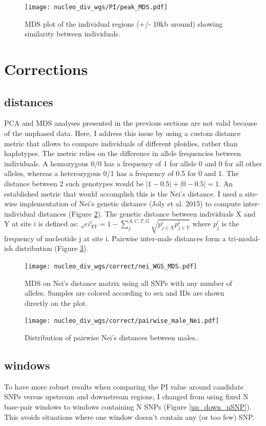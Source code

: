 \documentclass[10pt,a4paper]{report}
\begin{document}
\begin{figure}
\texttt{[image: nucleo\_div\_wgs/PI/peak\_MDS.pdf]}
\caption{MDS plot of the individual regions (+/- 10kb around) showing similarity between individuals.}
\label{MDS_peaks}
\end{figure}

\FloatBarrier

\section{Corrections}
\subsection{distances}
PCA and MDS analyses presented in the previous sections are not valid because of the unphased data. Here, I address this issue by using a custom distance metric that allows to compare individuals of different ploidies, rather than haplotypes. The metric relies on the difference in allele frequencies between individuals. A homozygous 0/0 has a frequency of 1 for allele 0 and 0 for all other alleles, whereas a heterozygous 0/1 has a frequency of 0.5 for 0 and 1. The distance between 2 such genotypes would be $|1-0.5| + |0-0.5| = 1$. An established metric that would accomplish this is the Nei's distance. I used a site-wise implementation of Nei's genetic distance (Joly et al. 2015) to compute inter-individual distances (Figure \ref{nei_MDS_wg}). The genetic distance between individuals X and Y at site i is defined as: $_nei^i_{XY}=1-\sum_{j}^{A,C,T,G}\sqrt{p^{i}_{j \in X}p^{i}_{j \in Y}}$ where $p_j^i$ is the frequency of nucleotide j at site i. Pairwise inter-male distances form a tri-modal-ish distribution (Figure \ref{nei_pairwise}).


\begin{figure}
\texttt{[image: nucleo\_div\_wgs/correct/nei\_WGS\_MDS.pdf]}
\caption{MDS on Nei's distance matrix using all SNPs with any number of alleles. Samples are colored according to sex and IDs are shown directly on the plot.}
\label{nei_MDS_wg}
\end{figure}

\begin{figure}
\texttt{[image: nucleo\_div\_wgs/correct/pairwise\_male\_Nei.pdf]}
\caption{Distribution of pairwise Nei's distances between males..}
\label{nei_pairwise}
\end{figure}

\subsection{windows}
To have more robust results when comparing the PI value around candidate SNPs versus upstream and downstream regions, I changed from using fixed N base-pair windows to windows containing N SNPs (Figure \ref{up_down_nSNP}). This avoids situations where one window doesn't contain any (or too few) SNP.
\end{document}
